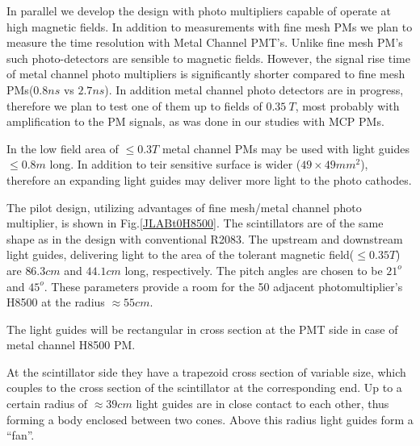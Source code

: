 
In parallel we develop  the design   with   
photo multipliers capable of operate at high  magnetic fields.
In addition to measurements with  fine mesh PMs 
we plan  to measure the time resolution with  Metal Channel PMT's. 
Unlike   fine mesh PM's such photo-detectors are  sensible to magnetic fields.
 However, the signal rise time
of metal channel photo multipliers is significantly shorter compared to 
fine mesh PMs($0.8ns$ vs $2.7ns$). In addition
metal channel photo detectors are in progress, therefore
 we plan to test  one of them up to fields of $0.35~T$, most 
probably with amplification to the PM signals, as was done in our studies with  MCP PMs.

In the low field area of $\leq0.3T$ metal channel PMs may be used 
with light guides $\leq0.8m$ long.
In addition to teir sensitive surface is wider ($49\times49mm^2$), therefore an expanding light guides
may  deliver more  light to the  photo cathodes.  

The  pilot design, utilizing advantages of fine mesh/metal channel 
photo multiplier, is shown in Fig.\ref{JLABt0H8500}.
The scintillators are of the same shape as in the design
 with conventional R2083.
The upstream and downstream light guides, 
delivering light to the area of the tolerant
 magnetic field($\leq0.35T$) are $86.3cm$ and $44.1cm$ long,
respectively.
The pitch angles are chosen to be $21^o$ and $45^o$. These parameters 
 provide  a room for the 50 adjacent 
 photomultiplier's H8500 at the radius  $\approx55cm$.

The light guides will  be  rectangular in cross section at the PMT side in 
case of metal channel H8500 PM.

At the scintillator side they  have a trapezoid cross section of variable 
size, which couples to the cross section of the scintillator
 at the corresponding end. 
Up to a certain radius of $\approx39cm$
light guides are in close contact to each other, thus forming a body 
enclosed between two cones. Above this radius light guides form a ``fan''.
  
